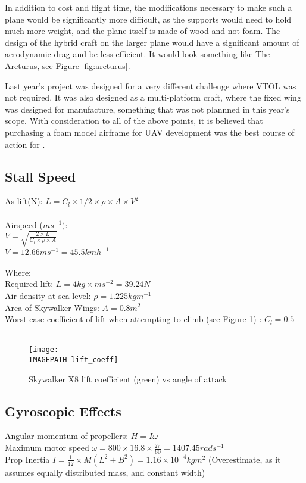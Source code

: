 In addition to cost and flight time, the modifications necessary to make such a plane would be significantly more difficult, as the supports would need to hold much more weight, and the plane itself is made of wood and not foam. The design of the hybrid craft on the larger plane would have a significant amount of aerodynamic drag and be less efficient. It would look something like The Arcturus, see Figure \ref{fig:arcturus}.
	
Last year's project was designed for a very different challenge where VTOL was not required. It was also designed as a multi-platform craft, where the fixed wing was designed for manufacture, something that was not plannned in this year's scope. With consideration to all of the above points, it is believed that purchasing a foam model airframe for UAV development was the best course of action for \ID.

\subsection{Stall Speed}
\label{sec:stall}
As lift(N): $L = C_l\times1/2\times\rho\times A\times V^2$\\\\
Airspeed ($ms^{-1})$:\\
$V= \sqrt{\frac{2\times L}{C_l\times \rho \times A}}$\\
$V = 12.66ms^{-1} = 45.5kmh^{-1}$\\\\
Where:\\
Required lift: $L = 4kg \times ms^{-2} = 39.24N$\\
Air density at sea level: $\rho = 1.225 kgm^{-1}$\\
Area of Skywalker Wings: $A = 0.8m^2$\\
Worst case coefficient of lift when attempting to climb (see Figure \ref{fig:lift})  
: $C_l = 0.5$
\\\\
\begin{figure}[!h]
	\centering
	\texttt{[image: \\IMAGEPATH lift\_coeff]}
	\caption{Skywalker X8 lift coefficient (green) vs angle of attack}
	\label{fig:lift}
\end{figure}


\subsection{Gyroscopic Effects}
\label{sec:gyro}
Angular momentum of propellers: $H = I\omega$\\
Maximum motor speed $\omega = 800\times16.8\times\frac{2\pi}{60} = 1407.45rads^{-1}$\\
Prop Inertia $I = \frac{1}{12}\times M(L^2+B^2) = 1.16\times10^{-4}kgm^2$ (Overestimate, as it assumes equally distributed mass, and constant width)\\\\


